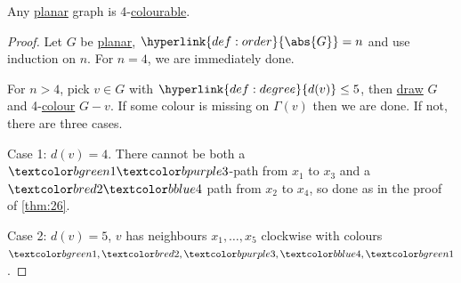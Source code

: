 \documentclass{article}
\begin{document}
\begin{nthm}\label{thm:27}
    Any \hyperlink{def:drawing}{planar} graph is 4-\hyperlink{def:colour}{colourable}.
\end{nthm}

\begin{proof}
    Let $G$ be \hyperlink{def:drawing}{planar}, $\hyperlink{def:order}{\abs{G}} = n$ and use induction on $n$. For $n=4$, we are immediately done.

    For $n > 4$, pick $v \in G$ with $\hyperlink{def:degree}{d(v)} \leq 5$, then \hyperlink{def:drawing}{draw} $G$ and 4-\hyperlink{def:colour}{colour} $G-v$.
    If some colour is missing on $\Gamma(v)$ then we are done.
    If not, there are three cases.

    Case 1: $d(v) = 4$.
    There cannot be both a $\green{1}\purple{3}$-path from $x_1$ to $x_3$ and a $\red{2}\blue{4}$ path from $x_2$ to $x_4$, so done as in the proof of \cref{thm:26}.
    \begin{center}
    \end{center}

    Case 2: $d(v) = 5$, $v$ has neighbours $x_1, \dotsc, x_5$ clockwise with colours $\green{1},\red{2},\purple{3},\blue{4},\green{1}$.


\end{proof}
\end{document}
